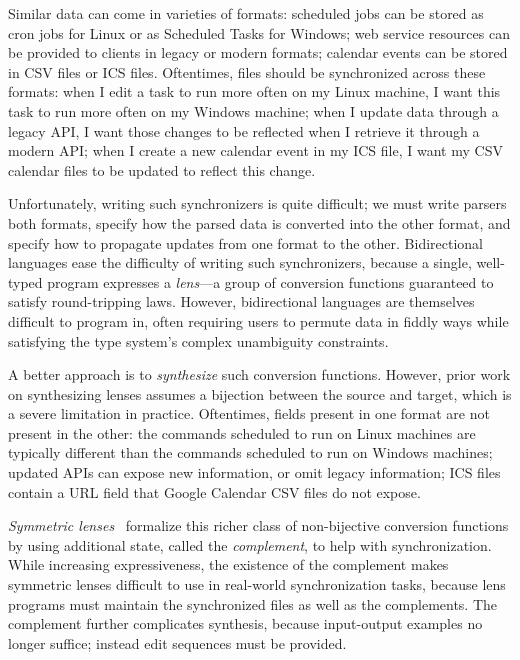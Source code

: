 \documentclass[acmsmall,screen,anonymous]{acmart}
\begin{document}
\noindent
{}

Similar data can come in varieties of formats: scheduled jobs can be stored as
cron jobs for Linux or as Scheduled Tasks for Windows; web service
resources can be provided to clients in legacy or modern formats;
calendar events can be stored in CSV files or ICS files. Oftentimes,
files should be synchronized across these formats: when I edit a task
to run more often on my Linux machine, I want this task to run more
often on my Windows machine; when I update data through a legacy API,
I want those changes to be reflected when I retrieve it through a
modern API; when I create a new calendar event in my ICS file, I want
my CSV calendar files to be updated to reflect this change.

Unfortunately, writing such synchronizers is quite difficult; we must write
parsers both formats, specify how the parsed data is converted into the other
format, and specify how to propagate updates from one format to the other.
Bidirectional languages ease the difficulty of writing such synchronizers,
because a single, well-typed program expresses a \emph{lens}---a group of
conversion functions guaranteed to satisfy round-tripping laws. However,
bidirectional languages are themselves difficult to program in, often requiring
users to permute data in fiddly ways while satisfying the type system's complex
unambiguity constraints.

A better approach is to \emph{synthesize} such conversion functions. However,
prior work on synthesizing lenses assumes a bijection between the source and
target, which is a severe limitation in practice. Oftentimes, fields present in
one format are not present in the other: the commands scheduled to run on Linux
machines are typically different than the commands scheduled to run on Windows
machines; updated APIs can expose new information, or omit legacy information;
ICS files contain a URL field that Google Calendar CSV files do not expose.

\emph{Symmetric lenses}~\cite{symmetric-lenses} formalize this richer class of
non-bijective conversion functions by using additional state, called the
\emph{complement}, to help with synchronization. While increasing
expressiveness, the existence of the complement makes symmetric lenses difficult
to use in real-world synchronization tasks, because lens programs must maintain
the synchronized files as well as the complements. The complement further
complicates synthesis, because input-output examples no longer suffice; instead
edit sequences must be provided.
\end{document}
